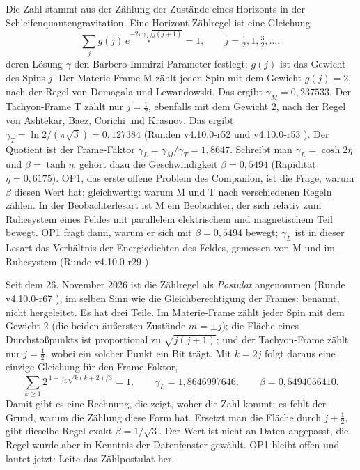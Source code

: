 Die Zahl stammt aus der Zählung der Zustände eines Horizonts in der
Schleifenquantengravitation. Eine Horizont-Zählregel ist eine Gleichung
\[
 \sum_j g(j)\,e^{-2\pi\gamma\sqrt{j(j+1)}}=1,\qquad j=\tfrac12,1,\tfrac32,\dots,
\]
deren Lösung \(\gamma\) den Barbero-Immirzi-Parameter festlegt; \(g(j)\) ist das
Gewicht des Spins \(j\). Der Materie-Frame M zählt jeden Spin mit dem Gewicht
\(g(j)=2\), nach der Regel von Domagala und Lewandowski. Das ergibt \(\gamma_M=0{,}237533\). Der
Tachyon-Frame T zählt nur \(j=\tfrac12\), ebenfalls mit dem Gewicht 2, nach der
Regel von Ashtekar, Baez, Corichi und Krasnov. Das ergibt
\(\gamma_T=\ln2/(\pi\sqrt3)=0{,}127384\) (Runden v4.10.0-r52 und v4.10.0-r53
\cite{layers}). Der Quotient ist der Frame-Faktor
\(\gamma_L=\gamma_M/\gamma_T=1{,}8647\). Schreibt man \(\gamma_L=\cosh2\eta\)
und \(\beta=\tanh\eta\), gehört dazu die Geschwindigkeit \(\beta=0{,}5494\)
(Rapidität \(\eta=0{,}6175\)). OP1, das erste offene Problem des Companion,
ist die Frage, warum \(\beta\) diesen Wert hat; gleichwertig: warum M und T
nach verschiedenen Regeln zählen. In der Beobachterlesart ist M ein
Beobachter, der sich relativ zum Ruhesystem eines Feldes mit parallelem
elektrischem und magnetischem Teil bewegt. OP1 fragt dann, warum er sich mit
\(\beta=0{,}5494\) bewegt; \(\gamma_L\) ist in dieser Lesart das Verhältnis
der Energiedichten des Feldes, gemessen von M und im Ruhesystem (Runde
v4.10.0-r29 \cite{companion}).

Seit dem 26. November 2026 ist die Zählregel als \emph{Postulat} angenommen (Runde v4.10.0-r67 \cite{countingpostulate}), im selben Sinn
wie die Gleichberechtigung der Frames: benannt, nicht hergeleitet. Es hat drei Teile. Im Materie-Frame zählt jeder Spin mit dem Gewicht 2
(die beiden äußersten Zustände \(m=\pm j\)); die Fläche eines Durchstoßpunkts ist proportional zu \(\sqrt{j(j+1)}\); und der
Tachyon-Frame zählt nur \(j=\tfrac12\), wobei ein solcher Punkt ein Bit trägt. Mit \(k=2j\) folgt daraus eine einzige Gleichung für den
Frame-Faktor,
\[
 \sum_{k\ge1}2^{\,1-\gamma_L\sqrt{k(k+2)/3}}=1,\qquad \gamma_L=1{,}8646997646,\qquad \beta=0{,}5494056410 .
\]
Damit gibt es eine Rechnung, die zeigt, woher die Zahl kommt; es fehlt der Grund, warum die Zählung diese Form hat. Ersetzt man die Fläche
durch \(j+\tfrac12\), gibt dieselbe Regel exakt \(\beta=1/\sqrt3\). Der Wert ist nicht an Daten angepasst, die Regel wurde aber in
Kenntnis der Datenfenster gewählt. OP1 bleibt offen und lautet jetzt: Leite das Zählpostulat her.


